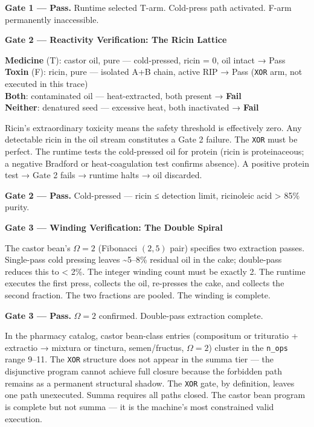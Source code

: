\documentclass[12pt,a4paper]{article}
\begin{document}
\textbf{Gate 1 --- Pass.} Runtime selected T-arm. Cold-press path
activated. F-arm permanently inaccessible.

\textbf{Gate 2 --- Reactivity Verification: The Ricin Lattice}

\textbf{Medicine} (T): castor oil, pure --- cold-pressed, ricin = 0, oil
intact → Pass\\
\textbf{Toxin} (F): ricin, pure --- isolated A+B chain, active RIP →
Pass (\texttt{XOR} arm, not executed in this trace)\\
\textbf{Both}: contaminated oil --- heat-extracted, both present →
\textbf{Fail}\\
\textbf{Neither}: denatured seed --- excessive heat, both inactivated →
\textbf{Fail}

Ricin's extraordinary toxicity means the safety threshold is effectively
zero. Any detectable ricin in the oil stream constitutes a Gate 2
failure. The \texttt{XOR} must be perfect. The runtime tests the
cold-pressed oil for protein (ricin is proteinaceous; a negative
Bradford or heat-coagulation test confirms absence). A positive protein
test → Gate 2 fails → runtime halts → oil discarded.

\textbf{Gate 2 --- Pass.} Cold-pressed --- ricin ≤ detection limit,
ricinoleic acid \textgreater{} 85\% purity.

\textbf{Gate 3 --- Winding Verification: The Double Spiral}

The castor bean's \(\Omega = 2\) (Fibonacci \((2,5)\) pair) specifies
two extraction passes. Single-pass cold pressing leaves
\textasciitilde5--8\% residual oil in the cake; double-pass reduces this
to \textless{} 2\%. The integer winding count must be exactly 2. The
runtime executes the first press, collects the oil, re-presses the cake,
and collects the second fraction. The two fractions are pooled. The
winding is complete.

\textbf{Gate 3 --- Pass.} \(\Omega = 2\) confirmed. Double-pass
extraction complete.

In the pharmacy catalog, castor bean-class entries (compositum or
trituratio + extractio → mixtura or tinctura, semen/fructus,
\(\Omega = 2\)) cluster in the \texttt{n\_ops} range 9--11. The
\texttt{XOR} structure does not appear in the summa tier --- the
disjunctive program cannot achieve full closure because the forbidden
path remains as a permanent structural shadow. The \texttt{XOR} gate, by
definition, leaves one path unexecuted. Summa requires all paths closed.
The castor bean program is complete but not summa --- it is the
machine's most constrained valid execution.
\end{document}
